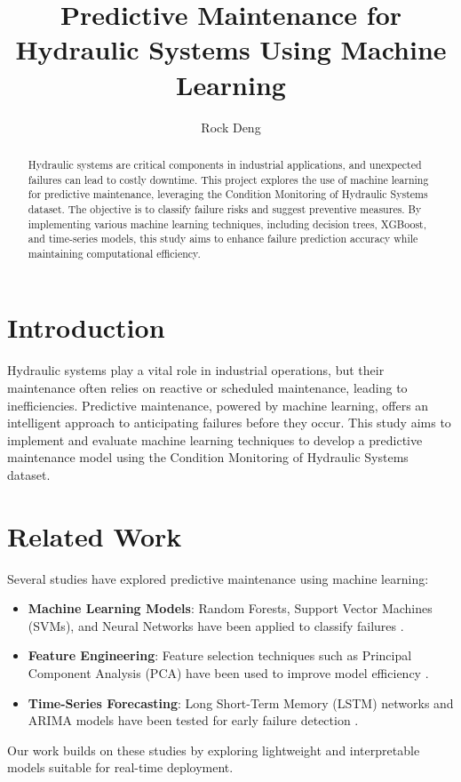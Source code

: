 \documentclass[sigconf]{acmart}
\title{Predictive Maintenance for Hydraulic Systems Using Machine Learning}
\author{Rock Deng}
\affiliation{%
  \institution{University of Colorado Boulder}}
\begin{document}
\begin{abstract}
Hydraulic systems are critical components in industrial applications, and unexpected failures can lead to costly downtime. This project explores the use of machine learning for predictive maintenance, leveraging the Condition Monitoring of Hydraulic Systems dataset. The objective is to classify failure risks and suggest preventive measures. By implementing various machine learning techniques, including decision trees, XGBoost, and time-series models, this study aims to enhance failure prediction accuracy while maintaining computational efficiency.
\end{abstract}

\maketitle

\section{Introduction}
Hydraulic systems play a vital role in industrial operations, but their maintenance often relies on reactive or scheduled maintenance, leading to inefficiencies. Predictive maintenance, powered by machine learning, offers an intelligent approach to anticipating failures before they occur. This study aims to implement and evaluate machine learning techniques to develop a predictive maintenance model using the Condition Monitoring of Hydraulic Systems dataset.

\section{Related Work}
Several studies have explored predictive maintenance using machine learning:
\begin{itemize}
    \item \textbf{Machine Learning Models}: Random Forests, Support Vector Machines (SVMs), and Neural Networks have been applied to classify failures \cite{helwig2015automated}.
    \item \textbf{Feature Engineering}: Feature selection techniques such as Principal Component Analysis (PCA) have been used to improve model efficiency \cite{alenany2021comprehensive}.
    \item \textbf{Time-Series Forecasting}: Long Short-Term Memory (LSTM) networks and ARIMA models have been tested for early failure detection \cite{goodarzi2023deep}.
\end{itemize}
Our work builds on these studies by exploring lightweight and interpretable models suitable for real-time deployment.
\end{document}
